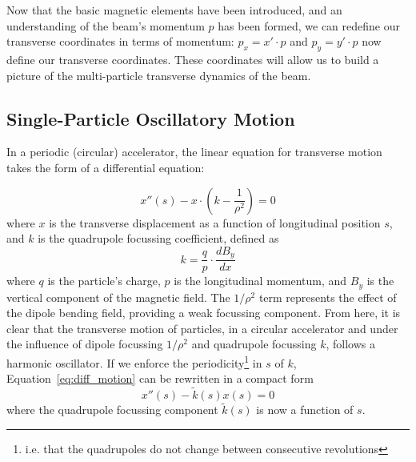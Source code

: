 \documentclass[11pt]{report}
\begin{document}
Now that the basic magnetic elements have been introduced, and an understanding of the beam's momentum $p$ has been formed, we can redefine our transverse coordinates in terms of momentum: $p_x=x'\cdot p$ and $p_y=y'\cdot p$ now define our transverse coordinates. These coordinates will allow us to build a picture of the multi-particle transverse dynamics of the beam.

\subsection{Single-Particle Oscillatory Motion}



In a periodic (circular) accelerator, the linear equation for transverse motion takes the form of a differential equation:

\begin{equation}
  x''(s)-x\cdot\left(k-\frac{1}{\rho^2}\right)=0
  \label{eq:diff_motion}
\end{equation} 
where $x$ is the transverse displacement as a function of longitudinal position $s$, and $k$ is the quadrupole focussing coefficient, defined as
\begin{equation}
  k=\frac{q}{p}\cdot\frac{dB_y}{dx}
  \label{eq:quadrupole}
\end{equation} where $q$ is the particle's charge, $p$ is the longitudinal momentum, and $B_y$ is the vertical component of the magnetic field. The $1/\rho^2$ term represents the effect of the dipole bending field, providing a weak focussing component.
From here, it is clear that the transverse motion of particles, in a circular accelerator and under the influence of dipole focussing $1/\rho^2$ and quadrupole focussing $k$, follows a harmonic oscillator. If we enforce the periodicity\footnote{i.e. that the quadrupoles do not change between consecutive revolutions} in $s$ of $k$, Equation~\ref{eq:diff_motion} can be rewritten in a compact form
\begin{equation}
  x''(s)-\tilde{k}(s)x(s)=0
  \label{eq:hill}
\end{equation} where the quadrupole focussing component $\tilde{k}(s)$ is now a function of $s$. 
\end{document}
